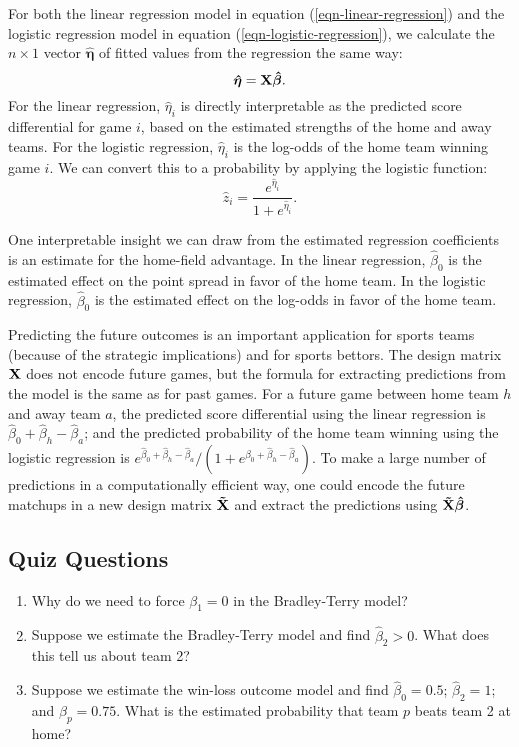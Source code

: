 \documentclass{article}
\begin{document}
  For both the linear regression model in equation (\ref{eqn-linear-regression}) and the logistic regression model in equation (\ref{eqn-logistic-regression}), we calculate the $n \times 1$ vector $\boldsymbol{\hat\eta}$ of fitted values from the regression the same way:
  \begin{equation*}
    \boldsymbol{\hat\eta} = {\bf X} \boldsymbol{\hat\beta}.
  \end{equation*}
  For the linear regression, $\hat\eta_i$ is directly interpretable as the predicted score differential for game $i$, based on the estimated strengths of the home and away teams. For the logistic regression, $\hat\eta_i$ is the log-odds of the home team winning game $i$. We can convert this to a probability by applying the logistic function:
  \begin{equation*}
    \hat z_i = \frac{e^{\hat\eta_i}}{1 + e^{\hat\eta_i}}.
  \end{equation*}

  One interpretable insight we can draw from the estimated regression coefficients is an estimate for the home-field advantage. In the linear regression, $\hat\beta_0$ is the estimated effect on the point spread in favor of the home team. In the logistic regression, $\hat\beta_0$ is the estimated effect on the log-odds in favor of the home team.

  Predicting the future outcomes is an important application for sports teams (because of the strategic implications) and for sports bettors. The design matrix $\bf X$ does not encode future games, but the formula for extracting predictions from the model is the same as for past games. For a future game between home team $h$ and away team $a$, the predicted score differential using the linear regression is $\hat\beta_0 + \hat\beta_h - \hat\beta_a$; and the predicted probability of the home team winning using the logistic regression is $e^{\hat\beta_0 + \hat\beta_h - \hat\beta_a} / (1 + e^{\hat\beta_0 + \hat\beta_h - \hat\beta_a})$. To make a large number of predictions in a computationally efficient way, one could encode the future matchups in a new design matrix $\bf \tilde X$ and extract the predictions using $\bf \tilde X \boldsymbol{\hat\beta}$.

  \subsection{\sc Quiz Questions}

  \begin{enumerate}
    \item Why do we need to force $\beta_1 = 0$ in the Bradley-Terry model?
    \item Suppose we estimate the Bradley-Terry model and find $\hat\beta_2 > 0$. What does this tell us about team 2?
    \item Suppose we estimate the win-loss outcome model and find $\hat\beta_0 = 0.5$; $\hat\beta_2 = 1$; and $\hat\beta_p = 0.75$. What is the estimated probability that team $p$ beats team 2 at home?
  \end{enumerate}
\end{document}
